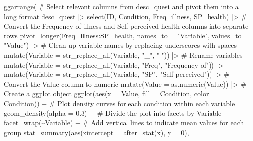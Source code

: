 \documentclass[
  bookmarksnumbered]{article}
\newenvironment{Shaded}{\begin{snugshade}}{\end{snugshade}}
\newcommand{\AttributeTok}[1]{\textcolor[rgb]{0.80,0.80,0.80}{#1}}
\newcommand{\CommentTok}[1]{\textcolor[rgb]{0.50,0.62,0.50}{#1}}
\newcommand{\DecValTok}[1]{\textcolor[rgb]{0.86,0.86,0.80}{#1}}
\newcommand{\FloatTok}[1]{\textcolor[rgb]{0.75,0.75,0.82}{#1}}
\newcommand{\FunctionTok}[1]{\textcolor[rgb]{0.94,0.94,0.56}{#1}}
\newcommand{\NormalTok}[1]{\textcolor[rgb]{0.80,0.80,0.80}{#1}}
\newcommand{\SpecialCharTok}[1]{\textcolor[rgb]{0.86,0.64,0.64}{#1}}
\newcommand{\StringTok}[1]{\textcolor[rgb]{0.80,0.58,0.58}{#1}}
\begin{document}
\begin{Shaded}
\begin{Highlighting}[]
\FunctionTok{ggarrange}\NormalTok{(}
  \CommentTok{\# Select relevant columns from desc\_quest and pivot them into a long format }
\NormalTok{  desc\_quest }\SpecialCharTok{|\textgreater{}}
    \FunctionTok{select}\NormalTok{(ID, Condition, Freq\_illness, SP\_health) }\SpecialCharTok{|\textgreater{}}
  \CommentTok{\# Convert the Frequency of illness and Self{-}perceived health columns into separate rows}
  \FunctionTok{pivot\_longer}\NormalTok{(Freq\_illness}\SpecialCharTok{:}\NormalTok{SP\_health,}
                \AttributeTok{names\_to =} \StringTok{"Variable"}\NormalTok{,}
                \AttributeTok{values\_to =} \StringTok{"Value"}\NormalTok{) }\SpecialCharTok{|\textgreater{}} 
  \CommentTok{\# Clean up variable names by replacing underscores with spaces}
  \FunctionTok{mutate}\NormalTok{(}\AttributeTok{Variable =} \FunctionTok{str\_replace\_all}\NormalTok{(Variable, }\StringTok{"\_"}\NormalTok{, }\StringTok{" "}\NormalTok{)) }\SpecialCharTok{|\textgreater{}}
  \CommentTok{\# Rename variables}
  \FunctionTok{mutate}\NormalTok{(}\AttributeTok{Variable =} \FunctionTok{str\_replace\_all}\NormalTok{(Variable, }\StringTok{"Freq"}\NormalTok{, }\StringTok{"Frequency of"}\NormalTok{)) }\SpecialCharTok{|\textgreater{}}
  \FunctionTok{mutate}\NormalTok{(}\AttributeTok{Variable =} \FunctionTok{str\_replace\_all}\NormalTok{(Variable, }\StringTok{"SP"}\NormalTok{, }\StringTok{"Self{-}perceived"}\NormalTok{)) }\SpecialCharTok{|\textgreater{}}
  \CommentTok{\# Convert the Value column to numeric}
  \FunctionTok{mutate}\NormalTok{(}\AttributeTok{Value =} \FunctionTok{as.numeric}\NormalTok{(Value)) }\SpecialCharTok{|\textgreater{}} 
  \CommentTok{\# Create a ggplot object}
  \FunctionTok{ggplot}\NormalTok{(}\FunctionTok{aes}\NormalTok{(}\AttributeTok{x =}\NormalTok{ Value, }\AttributeTok{fill =}\NormalTok{ Condition, }\AttributeTok{color =}\NormalTok{ Condition)) }\SpecialCharTok{+}
  \CommentTok{\# Plot density curves for each condition within each variable}
  \FunctionTok{geom\_density}\NormalTok{(}\AttributeTok{alpha =} \FloatTok{0.3}\NormalTok{) }\SpecialCharTok{+}
  \CommentTok{\# Divide the plot into facets by Variable}
  \FunctionTok{facet\_wrap}\NormalTok{(}\SpecialCharTok{\textasciitilde{}}\NormalTok{Variable) }\SpecialCharTok{+}
  \CommentTok{\# Add vertical lines to indicate mean values for each group}
  \FunctionTok{stat\_summary}\NormalTok{(}\FunctionTok{aes}\NormalTok{(}\AttributeTok{xintercept =} \FunctionTok{after\_stat}\NormalTok{(x), }\AttributeTok{y =} \DecValTok{0}\NormalTok{),}

\end{Highlighting}
\end{Shaded}
\end{document}
